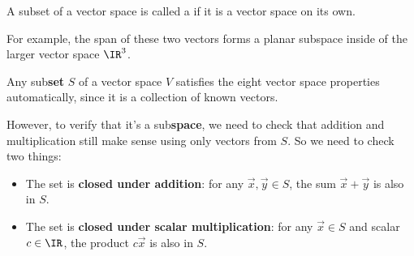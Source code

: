 
\begin{applicationActivities}



\begin{definition}
  A subset of a vector space is called a  if it is
  a vector space on its own.

  \vspace{1em}

  For example, the span of these two vectors forms a planar subspace
  inside of the larger vector space \(\IR^3\).

  \begin{center}
  \end{center}
\end{definition}



\begin{fact}
  Any sub\textbf{set} \(S\) of a vector space \(V\) satisfies the eight
  vector space properties automatically, since it is a collection of known
  vectors.

  \vspace{1em}

  However, to verify that it's a sub\textbf{space}, we need to check that
  addition and multiplication still make sense using only vectors from \(S\).
  So we need to check two things:

  \begin{itemize}
  \item The set is \textbf{closed under addition}: for any \(\vec{x},\vec{y} \in S\), the sum \(\vec{x}+\vec{y}\) is also in \(S\).
  \item The set is \textbf{closed under scalar multiplication}: for any \(\vec{x} \in S\) and scalar \(c \in \IR\), the product \(c\vec{x}\) is also in \(S\).
\end{itemize}
\end{fact}


\end{applicationActivities}

